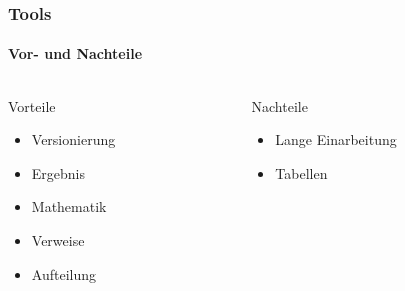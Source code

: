 \begin{frame}
    \frametitle{Tools}
    \framesubtitle{Vor- und Nachteile}
    \begin{columns}
        \begin{column}{0.50\textwidth}
            \begin{block}{Vorteile}
                \begin{itemize}
                    \item Versionierung
                    \item Ergebnis
                    \item Mathematik
                    \item Verweise
                    \item Aufteilung
                \end{itemize}
            \end{block}
        \end{column}
        \pause
        \begin{column}{0.50\textwidth}
            \begin{block}{Nachteile}
                \begin{itemize}
                    \item Lange Einarbeitung
                    \item Tabellen
                \end{itemize}
            \end{block}
        \end{column}
    \end{columns}
\end{frame}
